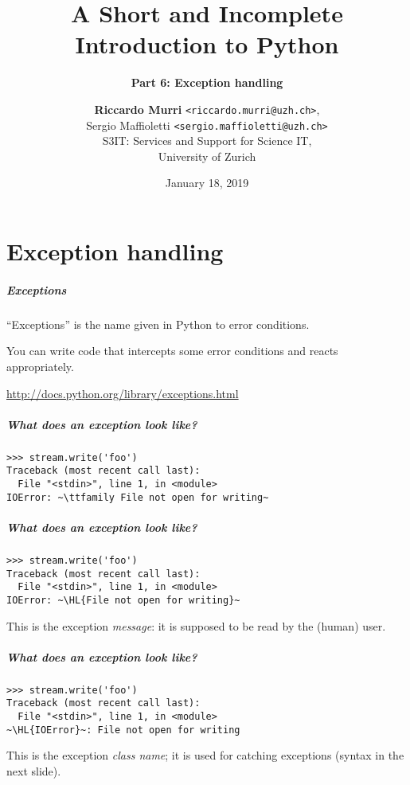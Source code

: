 \documentclass[english,serif,mathserif,xcolor=pdftex,dvipsnames,table]{beamer}
\title[6. Exception handling]{%
  A Short and Incomplete Introduction to Python
}
\subtitle{\bfseries Part 6: Exception handling}
\author[R.~Murri]{%
  \textbf{Riccardo Murri} \texttt{<riccardo.murri@uzh.ch>}, \\
  Sergio Maffioletti \texttt{<sergio.maffioletti@uzh.ch>}
  \\
  S3IT: Services and Support for Science IT,
  \\
  University of Zurich
}
\date{January 18, 2019}
\begin{document}
\maketitle


\part{Exception handling}

\begin{frame}[fragile]
  \frametitle{Exceptions}

  ``Exceptions'' is the name given in Python to error conditions.

  \+
  You can write code that intercepts some error conditions and
  reacts appropriately.

  \+
  \begin{seealso}
    \url{http://docs.python.org/library/exceptions.html}
  \end{seealso}
\end{frame}


\begin{frame}[fragile]
  \frametitle{What does an exception look like?}
\begin{lstlisting}
>>> stream.write('foo')
Traceback (most recent call last):
  File "<stdin>", line 1, in <module>
IOError: ~\ttfamily File not open for writing~
\end{lstlisting}
\end{frame}


\begin{frame}[fragile]
  \frametitle{What does an exception look like?}
\begin{lstlisting}
>>> stream.write('foo')
Traceback (most recent call last):
  File "<stdin>", line 1, in <module>
IOError: ~\HL{File not open for writing}~
\end{lstlisting}

  \+
  This is the exception \emph{message}: it is supposed to be read
  by the (human) user.
\end{frame}


\begin{frame}[fragile]
  \frametitle{What does an exception look like?}
\begin{lstlisting}
>>> stream.write('foo')
Traceback (most recent call last):
  File "<stdin>", line 1, in <module>
~\HL{IOError}~: File not open for writing
\end{lstlisting}

  \+ This is the exception \emph{class name}; it is used for catching
  exceptions (syntax in the next slide).
\end{frame}
\end{document}
